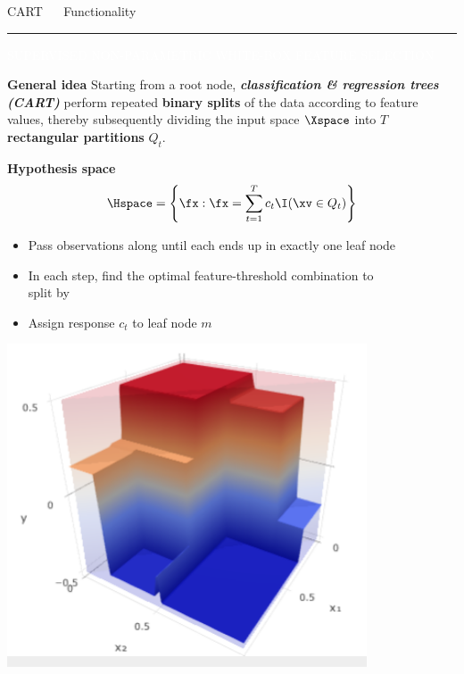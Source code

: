 \documentclass[11pt,compress,t,notes=noshow, xcolor=table]{beamer}
\begin{document}

\LARGE
\begin{frame}{\textcolor{gray!80}{CART} ~~ Functionality}
\normalsize
\vspace{-0.5cm}
\noindent \textcolor{gray!80}{\rule{\textwidth}{1pt}}

\vspace{0.2cm}

\footnotesize

\colorbox{gray!80}{\textcolor{white}{SUPERVISED}} 
\colorbox{gray!80}{\textcolor{white}{NON-PARAMETRIC}} 
\colorbox{gray!80}{\textcolor{white}{WHITE-BOX}} 
\colorbox{gray!80}{\textcolor{white}{FEATURE SELECTION}}

\medskip

\textbf{\textcolor{gray!80}{General idea}} {}{} Starting from a root node, 
\textit{\textbf{classification \& regression trees (CART)}} 
perform repeated \textbf{binary splits} of the data according to feature values, 
thereby subsequently dividing the input space $\Xspace$ into $T$ 
\textbf{rectangular partitions} $Q_t$.

\medskip

\textbf{\textcolor{gray!80}{Hypothesis space}}
$$\Hspace = \left\{ \fx: \fx = \sum_{t = 1}^T c_t \I(\xv \in Q_t) 
\right\}$$

\medskip

\begin{minipage}{0.5\textwidth}
  \begin{itemize}
    \item Pass observations along until each ends up in exactly 
    one leaf node
    \item In each step, find the optimal feature-threshold
    combination to \\ split by
  \item Assign response $c_t$ to leaf node $m$
\end{itemize}

\end{minipage}%
\begin{minipage}{0.5\textwidth}
  \includegraphics[width=0.8\textwidth]{figure/cart_3d.PNG}
\end{minipage}

\end{frame}
\end{document}
